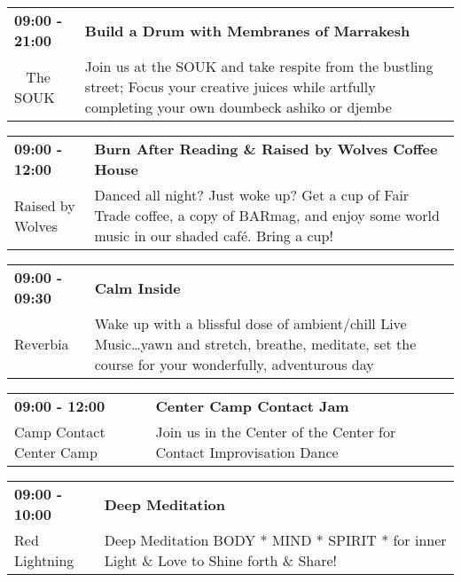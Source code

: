 \begin{tabular}{ p{1in} p{2.2in} }
    \textbf{09:00 - 21:00} & \textbf{Build a Drum with Membranes of Marrakesh} \\
    ~ \newline The SOUK & Join us at the SOUK and take respite from the bustling street; Focus your creative juices while artfully completing your own doumbeck ashiko or djembe \\
    \hline 
\end{tabular}
    
\begin{tabular}{ p{1in} p{2.2in} }
    \textbf{09:00 - 12:00} & \textbf{Burn After Reading \& Raised by Wolves Coffee House} \\
    Raised by Wolves \newline  & Danced all night? Just woke up? Get a cup of Fair Trade coffee, a copy of BARmag, and enjoy some world music in our shaded caf\'e. Bring a cup! \\
    \hline 
\end{tabular}
    
\begin{tabular}{ p{1in} p{2.2in} }
    \textbf{09:00 - 09:30} & \textbf{Calm Inside} \\
    Reverbia \newline  & Wake up with a blissful dose of ambient/chill Live Music\ldots yawn and stretch, breathe, meditate, set the course for your wonderfully, adventurous day \\
    \hline 
\end{tabular}
    
\begin{tabular}{ p{1in} p{2.2in} }
    \textbf{09:00 - 12:00} & \textbf{Center Camp Contact Jam} \\
    Camp Contact \newline Center Camp & Join us in the Center of the Center for Contact Improvisation Dance \\
    \hline 
\end{tabular}
    
\begin{tabular}{ p{1in} p{2.2in} }
    \textbf{09:00 - 10:00} & \textbf{Deep Meditation} \\
    Red Lightning \newline  & Deep Meditation BODY * MIND * SPIRIT * for inner Light \& Love to Shine forth \& Share! \\
    \hline 
\end{tabular}
    
